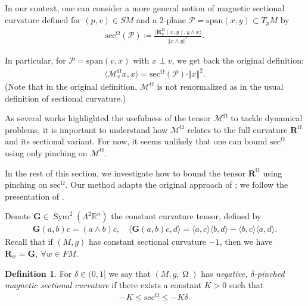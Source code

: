 \documentclass[12pt]{amsart}
\numberwithin{numbering}{section}
\theoremstyle{plain}
\theoremstyle{definition}
\newtheorem{df}[numbering]{Definition}
\theoremstyle{remark}
\numberwithin{equation}{section}
\DeclareMathOperator{\Sym}{Sym}
\DeclareMathOperator{\mg}{\Omega}
\newcommand{\rfm}{\mathbf{R}}
\newcommand{\rsfm}{\mathbf{R}^{\mg}}
\newcommand{\R}{\mathbb{R}}
\begin{document}
In our context, one can consider a more general notion of magnetic sectional curvature defined for $(p, v) \in SM$ and a 2-plane $\mathcal{P} = \mathrm{span}(x, y) \subset T_p M$ by 
\begin{align} \label{def:mag_sec_curv}
\mathrm{sec}^{\mg}(\mathcal{P}) \coloneq \frac{\langle \rsfm_v(x, y), y \wedge x \rangle}{\Vert x \wedge y \Vert^2}.
\end{align}

In particular, for $\mathcal{P} = \mathrm{span}(v, x)$ with $x \perp v$, we get back the original definition:
\begin{align}
\langle \mathcal{M}^{\mg}_v x, x \rangle = \mathrm{sec}^{\mg}(\mathcal{P}) \cdot \Vert x \Vert^2.
\end{align}
(Note that in the original definition, $\mathcal{M}^{\mg}$ is not renormalized as in the usual definition of sectional curvature.)

As several works highlighted the usefulness of the tensor $\mathcal{M}^{\mg}$ to tackle dynamical problems, it is important to understand how $\mathcal{M}^{\mg}$ relates to the full curvature $\rsfm$ and its sectional variant. For now, it seems unlikely that one can bound $\mathrm{sec}^{\mg}$ using only pinching on $\mathcal{M}^{\mg}$.

\bigskip 

In the rest of this section, we investigate how to bound the tensor $\rsfm$ using pinching on $\mathrm{sec}^{\mg}$. Our method adapts the original approach of \cite{bourguignon1978curvature}; we follow the presentation of \cite[Section 19.2]{lefeuvre2024microlocal}.

Denote $\mathbf{G} \in \Sym^2 (\Lambda^2 \R^n)$ the constant curvature tensor, defined by 
\begin{align}
\mathbf{G}(a, b) c = (a \wedge b) c, \quad \langle \mathbf{G}(a, b) c, d \rangle = \langle a, c \rangle \langle b, d \rangle - \langle b, c \rangle \langle a, d \rangle.
\end{align}
Recall that if $(M, g)$ has constant sectional curvature $-1$, then we have $\rfm_w = \mathbf{G}, \ \forall w \in FM$. 

\begin{df}
For $\delta  \in (0, 1]$ we say that $(M, g, \mg)$ has \emph{negative, $\delta$-pinched magnetic sectional curvature} if there exists a constant $K > 0$ such that 
\begin{align}
- K \leq \mathrm{sec}^{\mg} \leq - K \delta.
\end{align} 
\end{df}
\end{document}

